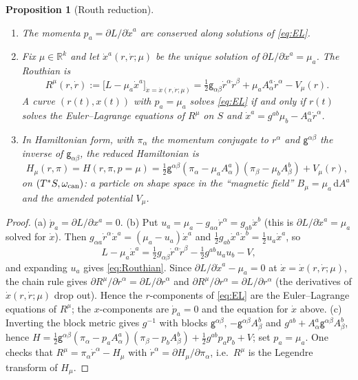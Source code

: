 \documentclass[11pt,a4paper]{article}
\numberwithin{equation}{section}
\theoremstyle{plain}
\newtheorem{proposition}[theorem]{Proposition}
\theoremstyle{definition}
\theoremstyle{remark}
\newcommand{\R}{\mathbb{R}}
\newcommand{\dd}{\mathrm{d}}
\begin{document}
\begin{proposition}[Routh reduction]\label{prop:routh}
\begin{enumerate}[label=(\alph*)]
\item The momenta $p_a=\partial L/\partial\dot x^a$ are conserved along solutions of \eqref{eq:EL}.
\item Fix $\mu\in\R^k$ and let $\dot x^a(r,\dot r;\mu)$ be the unique solution of $\partial L/\partial\dot x^a=\mu_a$. The \emph{Routhian} is
\begin{equation}\label{eq:Routhian}
R^\mu(r,\dot r):=\big[L-\mu_a\dot x^a\big]_{\dot x=\dot x(r,\dot r;\mu)}
=\tfrac12\mathsf g_{\alpha\beta}\dot r^\alpha\dot r^\beta+\mu_aA^a_\alpha\dot r^\alpha-V_\mu(r).
\end{equation}
A curve $(r(t),x(t))$ with $p_a=\mu_a$ solves \eqref{eq:EL} if and only if $r(t)$ solves the Euler--Lagrange equations of $R^\mu$ on $S$ and $\dot x^a=g^{ab}\mu_b-A^a_\alpha\dot r^\alpha$.
\item In Hamiltonian form, with $\pi_\alpha$ the momentum conjugate to $r^\alpha$ and $\mathsf g^{\alpha\beta}$ the inverse of $\mathsf g_{\alpha\beta}$, the reduced Hamiltonian is
\begin{equation}\label{eq:Hmu}
H_\mu(r,\pi)=H(r,\pi,p=\mu)=\tfrac12\mathsf g^{\alpha\beta}(\pi_\alpha-\mu_aA^a_\alpha)(\pi_\beta-\mu_bA^b_\beta)+V_\mu(r),
\end{equation}
on $(T^*S,\omega_{\rm can})$: a particle on shape space in the ``magnetic field'' $B_\mu=\mu_a\,\dd A^a$ and the amended potential $V_\mu$.
\end{enumerate}
\end{proposition}
\begin{proof}
(a) $\dot p_a=\partial L/\partial x^a=0$. (b) Put $u_a=\mu_a-g_{a\alpha}\dot r^\alpha=g_{ab}\dot x^b$ (this is $\partial L/\partial\dot x^a=\mu_a$ solved for $\dot x$). Then $g_{\alpha a}\dot r^\alpha\dot x^a=(\mu_a-u_a)\dot x^a$ and $\tfrac12g_{ab}\dot x^a\dot x^b=\tfrac12u_a\dot x^a$, so
\[
L-\mu_a\dot x^a=\tfrac12g_{\alpha\beta}\dot r^\alpha\dot r^\beta-\tfrac12g^{ab}u_au_b-V ,
\]
and expanding $u_a$ gives \eqref{eq:Routhian}. Since $\partial L/\partial\dot x^a-\mu_a=0$ at $\dot x=\dot x(r,\dot r;\mu)$, the chain rule gives
$\partial R^\mu/\partial\dot r^\alpha=\partial L/\partial\dot r^\alpha$ and $\partial R^\mu/\partial r^\alpha=\partial L/\partial r^\alpha$ (the derivatives of $\dot x(r,\dot r;\mu)$ drop out). Hence the $r$-components of \eqref{eq:EL} are the Euler--Lagrange equations of $R^\mu$; the $x$-components are $\dot p_a=0$ and the equation for $\dot x$ above. (c) Inverting the block metric gives $g^{-1}$ with blocks $\mathsf g^{\alpha\beta}$, $-\mathsf g^{\alpha\beta}A^b_\beta$ and $g^{ab}+A^a_\alpha\mathsf g^{\alpha\beta}A^b_\beta$, hence $H=\tfrac12\mathsf g^{\alpha\beta}(\pi_\alpha-p_aA^a_\alpha)(\pi_\beta-p_bA^b_\beta)+\tfrac12g^{ab}p_ap_b+V$; set $p_a=\mu_a$. One checks that $R^\mu=\pi_\alpha\dot r^\alpha-H_\mu$ with $\dot r^\alpha=\partial H_\mu/\partial\pi_\alpha$, i.e.\ $R^\mu$ is the Legendre transform of $H_\mu$.
\end{proof}
\end{document}
